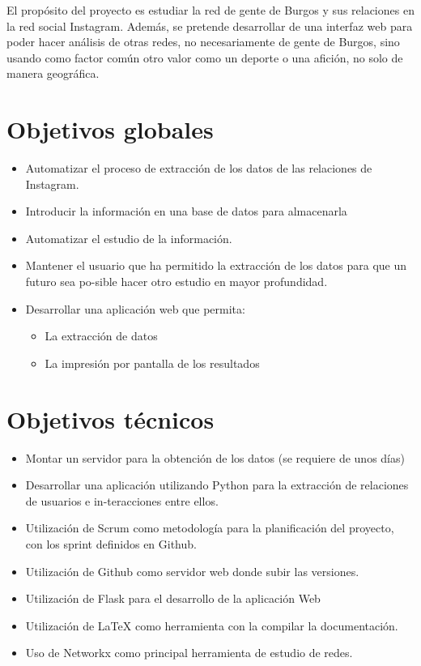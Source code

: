 
El propósito del proyecto es estudiar la red de gente de Burgos y sus relaciones en la red social Instagram.
Además, se pretende desarrollar de una interfaz web para poder hacer análisis de otras redes, no necesariamente de gente de Burgos, sino usando como factor común otro valor como un deporte o una afición, no solo de manera geográfica.

\section{Objetivos globales}

\begin{itemize}
	\item Automatizar el proceso de extracción de los datos de las relaciones de Instagram.
	
	\item Introducir la información en una base de datos para almacenarla
	
	\item Automatizar el estudio de la información.
	
	\item Mantener el usuario que ha permitido la extracción de los datos para que un futuro sea po-sible hacer otro estudio en mayor profundidad.
	
	\item Desarrollar una aplicación web que permita:
	\begin{itemize}
	\item La extracción de datos
	\item La impresión por pantalla de los resultados
	\end{itemize}
	
\end{itemize}

\section{Objetivos técnicos}

\begin{itemize}
    \item Montar un servidor para la obtención de los datos (se requiere de unos días)
    \item Desarrollar una aplicación utilizando Python para la extracción de relaciones de usuarios e in-teracciones entre ellos.
    \item Utilización de Scrum como metodología para la planificación del proyecto, con los sprint definidos en Github.
    \item Utilización de Github como servidor web donde subir las versiones.
    \item Utilización de Flask para el desarrollo de la aplicación Web
    \item Utilización de LaTeX como herramienta con la compilar la documentación.
    \item Uso de Networkx como principal herramienta de estudio de redes.
\end{itemize}

